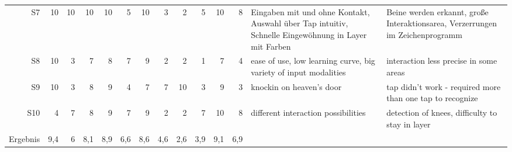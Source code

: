 \begin{landscape}
\begin{table}[htbp]
\begin{tabular}{rrrrrrrrrrrrm{4.5cm}m{4.5cm}}
    S7    & 10    & 10    & 10    & 10    & 5     & 10    & 3     & 2     & 5     & 10    & 8     & Eingaben mit und ohne Kontakt, Auswahl über Tap intuitiv, Schnelle Eingewöhnung in Layer mit Farben & Beine werden erkannt, große Interaktionsarea, Verzerrungen im Zeichenprogramm \\
    S8    & 10    & 3     & 7     & 8     & 7     & 9     & 2     & 2     & 1     & 7     & 4     & ease of use, low learning curve, big variety of input modalities & interaction less precise in some areas \\
    S9    & 10    & 3     & 8     & 9     & 4     & 7     & 7     & 10    & 3     & 9     & 3     & knockin on heaven's door & tap didn't work - required more than one tap to recognize \\
    S10   & 4     & 7     & 8     & 9     & 7     & 9     & 2     & 2     & 7     & 10    & 8     & different interaction possibilities & detection of knees, difficulty to stay in layer \\
    Ergebnis & 9,4   & 6     & 8,1   & 8,9   & 6,6   & 8,6   & 4,6   & 2,6   & 3,9   & 9,1   & 6,9   &       &  \\
    \bottomrule
    \end{tabular}%
  \label{tab:app_eval_captap_raw_quest}%
\end{table}%


\end{landscape}




